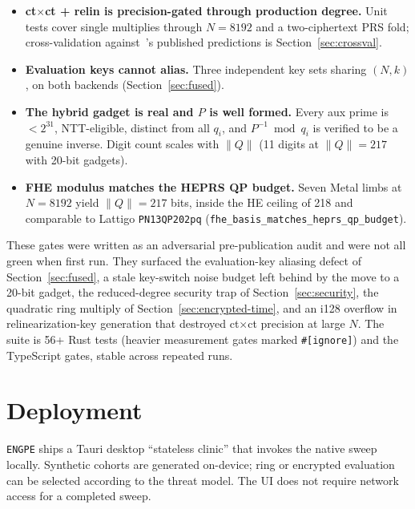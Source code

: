 \documentclass[11pt,a4paper]{article}
\newcommand{\engpe}{\texttt{ENGPE}}
\DeclareRobustCommand{\code}[1]{\texttt{#1}}
\begin{document}
\begin{itemize}
{        not derived.}
        After the hoist and the move to ct$\times$ct, the full 110k panel costs
        \textbf{14 relinearizations + 13 rotations = 27 key-switches per patient}
        (108 limb ops at 4 RNS limbs), confirmed by
        \code{audit\_full\_panel\_keyswitch\_count\_matches\_paper}
        (\code{--ignored}).
  \item \textbf{ct$\times$ct + relin is precision-gated through production degree.}
        Unit tests cover single multiplies through $N{=}8192$ and a two-ciphertext
        PRS fold; cross-validation against~\cite{knight2026heprs}'s published
        predictions is Section~\ref{sec:crossval}.
  \item \textbf{Evaluation keys cannot alias.}
        Three independent key sets sharing $(N, k)$, on both backends
        (Section~\ref{sec:fused}).
  \item \textbf{The hybrid gadget is real and $P$ is well formed.}
        Every aux prime is $< 2^{31}$, NTT-eligible, distinct from all $q_i$, and
        $P^{-1} \bmod q_i$ is verified to be a genuine inverse. Digit count scales
        with $\|Q\|$ (11 digits at $\|Q\| = 217$ with 20-bit gadgets).
  \item \textbf{FHE modulus matches the HEPRS QP budget.}
        Seven Metal limbs at $N = 8192$ yield $\|Q\| = 217$ bits, inside the HE
        ceiling of 218 and comparable to Lattigo \code{PN13QP202pq}
        (\code{fhe\_basis\_matches\_heprs\_qp\_budget}).
\end{itemize}

These gates were written as an adversarial pre-publication audit and were not all
green when first run. They surfaced the evaluation-key aliasing defect of
Section~\ref{sec:fused}, a stale key-switch noise budget left behind by the move
to a 20-bit gadget, the reduced-degree security trap of
Section~\ref{sec:security}, the quadratic ring multiply of
Section~\ref{sec:encrypted-time}, and an i128 overflow in relinearization-key
generation that destroyed ct$\times$ct precision at large $N$. The suite is 56+
Rust tests (heavier measurement gates marked \code{\#[ignore]}) and the TypeScript
gates, stable across repeated runs.

\section{Deployment}
\label{sec:deploy}

\engpe{} ships a Tauri desktop ``stateless clinic'' that invokes the native sweep
locally. Synthetic cohorts are generated on-device; ring or encrypted evaluation can
be selected according to the threat model. The UI does not require network access
for a completed sweep.
\end{document}
